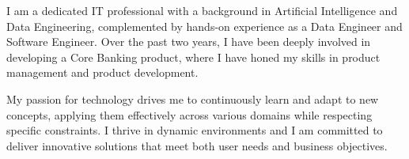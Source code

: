 \par{
I am a dedicated IT professional with a background in Artificial Intelligence and Data Engineering, complemented by hands-on experience as a Data Engineer and Software Engineer. Over the past two years, I have been deeply involved in developing a Core Banking product, where I have honed my skills in product management and product development.

My passion for technology drives me to continuously learn and adapt to new concepts, applying them effectively across various domains while respecting specific constraints. I thrive in dynamic environments and I am committed to deliver innovative solutions that meet both user needs and business objectives.
}